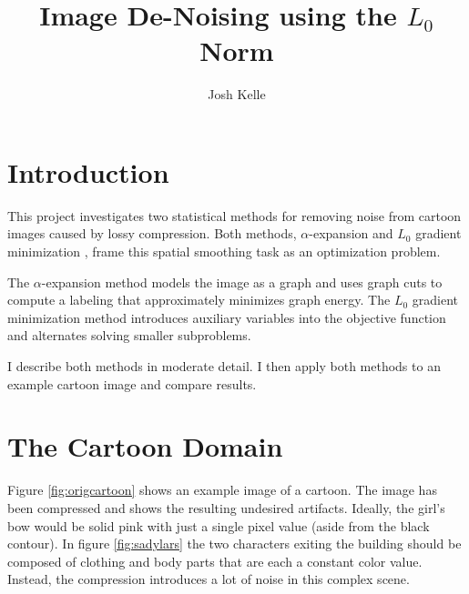 \documentclass[10pt,twocolumn,letterpaper]{article}
\title{Image De-Noising using the $L_0$ Norm}
\author{Josh Kelle}
\begin{document}
\maketitle

\section{Introduction}
This project investigates two statistical methods for removing noise from cartoon images caused by lossy compression. Both methods, $\alpha$-expansion \cite{boykov2001fast} and $L_0$ gradient minimization \cite{xu2011image}, frame this spatial smoothing task as an optimization problem.

The $\alpha$-expansion method models the image as a graph and uses graph cuts to compute a labeling that approximately minimizes graph energy. The $L_0$ gradient minimization method introduces auxiliary variables into the objective function and alternates solving smaller subproblems.

I describe both methods in moderate detail. I then apply both methods to an example cartoon image and compare results.

\section{The Cartoon Domain}
Figure \ref{fig:origcartoon} shows an example image of a cartoon. The image has been compressed and shows the resulting undesired artifacts. Ideally, the girl's bow would be solid pink with just a single pixel value (aside from the black contour). In figure \ref{fig:sadylars} the two characters exiting the building should be composed of clothing and body parts that are each a constant color value. Instead, the compression introduces a lot of noise in this complex scene.
\end{document}
